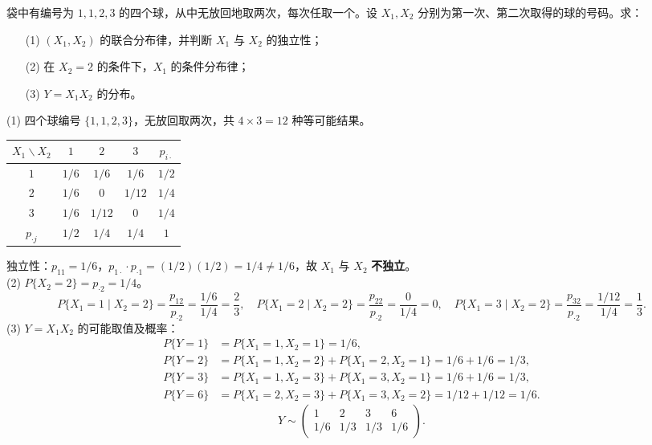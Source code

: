 \documentclass[lang=cn,11pt]{elegantbook}
\begin{document}
\begin{exercise}[无放回取球] \label{exer:3-c8}
袋中有编号为 $1,1,2,3$ 的四个球，从中无放回地取两次，每次任取一个。设 $X_1, X_2$ 分别为第一次、第二次取得的球的号码。求：
\begin{enumerate}
    \item[(1)] $(X_1,X_2)$ 的联合分布律，并判断 $X_1$ 与 $X_2$ 的独立性；
    \item[(2)] 在 $X_2=2$ 的条件下，$X_1$ 的条件分布律；
    \item[(3)] $Y = X_1X_2$ 的分布。
\end{enumerate}
\end{exercise}
\begin{solution}
(1) 四个球编号 $\{1,1,2,3\}$，无放回取两次，共 $4\times 3 = 12$ 种等可能结果。
\begin{center}
\begin{tabular}{c|ccc|c}
\toprule
$X_1 \backslash X_2$ & $1$ & $2$ & $3$ & $p_{i\cdot}$ \\
\midrule
$1$ & $1/6$ & $1/6$ & $1/6$ & $1/2$ \\[4pt]
$2$ & $1/6$ & $0$ & $1/12$ & $1/4$ \\[4pt]
$3$ & $1/6$ & $1/12$ & $0$ & $1/4$ \\
\midrule
$p_{\cdot j}$ & $1/2$ & $1/4$ & $1/4$ & $1$ \\
\bottomrule
\end{tabular}
\end{center}
独立性：$p_{11} = 1/6$，$p_{1\cdot}\cdot p_{\cdot 1} = (1/2)(1/2) = 1/4 \neq 1/6$，故 $X_1$ 与 $X_2$ \textbf{不独立}。\\
(2) $P\{X_2=2\} = p_{\cdot 2} = 1/4$。
\[
P\{X_1=1 \mid X_2=2\} = \frac{p_{12}}{p_{\cdot 2}} = \frac{1/6}{1/4} = \frac{2}{3}, \quad P\{X_1=2 \mid X_2=2\} = \frac{p_{22}}{p_{\cdot 2}} = \frac{0}{1/4} = 0, \quad P\{X_1=3 \mid X_2=2\} = \frac{p_{32}}{p_{\cdot 2}} = \frac{1/12}{1/4} = \frac{1}{3}.
\]
(3) $Y = X_1X_2$ 的可能取值及概率：
\begin{align*}
P\{Y=1\} &= P\{X_1=1,X_2=1\} = 1/6, \\
P\{Y=2\} &= P\{X_1=1,X_2=2\} + P\{X_1=2,X_2=1\} = 1/6 + 1/6 = 1/3, \\
P\{Y=3\} &= P\{X_1=1,X_2=3\} + P\{X_1=3,X_2=1\} = 1/6 + 1/6 = 1/3, \\
P\{Y=6\} &= P\{X_1=2,X_2=3\} + P\{X_1=3,X_2=2\} = 1/12 + 1/12 = 1/6.
\end{align*}
\[
Y \sim \begin{pmatrix} 1 & 2 & 3 & 6 \\ 1/6 & 1/3 & 1/3 & 1/6 \end{pmatrix}.
\]
\end{solution}
\end{document}
